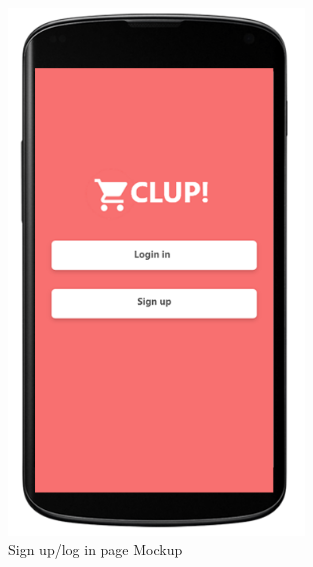 \begin{figure}[H]
  \centering
  \includegraphics[width=0.7\textwidth,keepaspectratio]{images/5.png}
  \caption{Sign up/log in page Mockup}
\end{figure}
